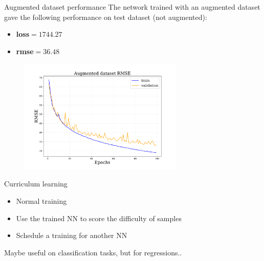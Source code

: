 \documentclass{beamer}
\begin{document}
\begin{frame}{Augmented dataset performance}
    The network trained with an augmented dataset gave the following performance on test dataset (not augmented):
    \begin{itemize}
        \item[\textbullet] \textbf{loss}$=1744.27$
        \item[\textbullet] \textbf{rmse}$=36.48$
    \end{itemize}

        \begin{figure}
            \centering
            \includegraphics[width=0.7\textwidth]{figures/lstmenc_aug_rmse.pdf}
        \end{figure}

\end{frame}



\begin{frame}{Curriculum learning}
    \begin{itemize}
        \item Normal training
        \item Use the trained NN to score the difficulty of samples
        \item Schedule a training for another NN
    \end{itemize}
    \vfill
    Maybe useful on classification tasks, but for regressions..
\end{frame}
\end{document}
